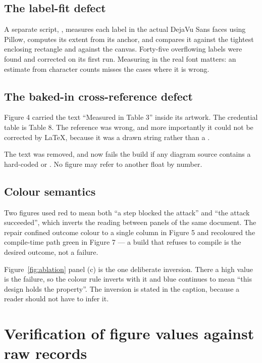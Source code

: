 \subsection{The label-fit defect}

A separate script, , measures each label in the actual
DejaVu Sans faces using Pillow, computes its extent from its anchor, and compares it against the
tightest enclosing rectangle and against the canvas. Forty-five overflowing labels were found and
corrected on its first run. Measuring in the real font matters: an estimate from character counts
misses the cases where it is wrong.

\subsection{The baked-in cross-reference defect}

Figure 4 carried the text ``Measured in Table 3'' inside its artwork. The credential table is
Table 8. The reference was wrong, and more importantly it could not be corrected by \LaTeX{},
because it was a drawn string rather than a .

The text was removed, and  now fails the build if any diagram source
contains a hard-coded  or . No figure may refer to another float by
number.

\subsection{Colour semantics}

Two figures used red to mean both ``a step blocked the attack'' and ``the attack succeeded'',
which inverts the reading between panels of the same document. The repair confined outcome colour
to a single column in Figure 5 and recoloured the compile-time  path green in
Figure 7 --- a build that refuses to compile is the desired outcome, not a failure.

Figure~\ref{fig:ablation} panel (c) is the one deliberate inversion. There a high value is the
failure, so the colour rule inverts with it and blue continues to mean ``this design holds the
property''. The inversion is stated in the caption, because a reader should not have to infer it.

\section{Verification of figure values against raw records}

